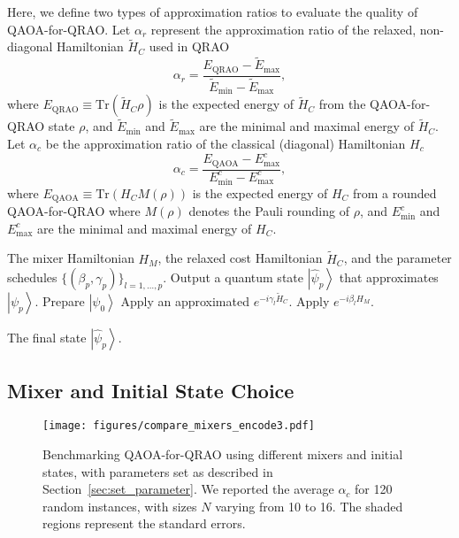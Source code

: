 \documentclass[conference,10pt]{IEEEtran}
\newcommand{\QAOAQRAO}{QAOA-for-QRAO}
\begin{document}
Here, we define two types of approximation ratios to evaluate the quality of \QAOAQRAO{}.  
Let $\alpha_r$ represent the approximation ratio of the relaxed, non-diagonal Hamiltonian $\tilde{H}_C$ used in QRAO 
\begin{equation} 
\alpha_r = \frac{ E_{\text{QRAO}} - \tilde{E}_{\text{max}}}{\tilde{E}_{\text{min}} - \tilde{E}_{\text{max}}}, 
\end{equation}
where $E_{\text{QRAO}} \equiv \mbox{Tr}(\tilde{H}_C\rho)$ is the expected energy of $\tilde{H}_C$ from the \QAOAQRAO{} state $\rho$, and $\tilde{E}_{\text{min}}$ and $\tilde{E}_{\text{max}}$ are the minimal and maximal energy of $\tilde{H}_C$. 
Let $\alpha_c$ be the approximation ratio of the classical (diagonal) Hamiltonian $H_c$ 
\begin{equation}
\alpha_c = \frac{E_{\text{QAOA}} - E_{\text{max}}^c}{E_{\text{min}}^c - E_{\text{max}}^c},
\end{equation}
where $E_{\text{QAOA}} \equiv \mbox{Tr}({H}_C \mathit{M}(\rho))$ is the expected energy of ${H}_C$ from a rounded \QAOAQRAO{} where $\mathit{M}(\rho)$ denotes the Pauli rounding of $\rho$, and $E_{\text{min}}^c$ and $E_{\text{max}}^c$ are the minimal and maximal energy of $H_C$. 

\begin{algorithm}[t]
\caption{Implement \QAOAQRAO{}}\label{alg:driftqrao}
\begin{algorithmic}[1]
    \Require The mixer Hamiltonian $H_M$, the relaxed cost Hamiltonian $\tilde{H}_C$, and the parameter schedules $\{(\beta_p, \gamma_p)\}_{l=1,\ldots,p}$.
    \Ensure Output a quantum state $\left|\widehat{\psi}_p \right>$ that approximates $\left|\psi_p\right>$.
    \State Prepare $\left|\psi_0\right>$
        \State Apply an approximated $e^{-i\gamma_l \tilde{H}_C}$.
        \State Apply $e^{-i\beta_l H_M}$.
    \EndFor
    
    \State \Return The final state $\left|\widehat{\psi}_p\right>$. 
\end{algorithmic}
\end{algorithm}









\subsection{Mixer and Initial State Choice}
\begin{figure}[t]
    \centering
    \texttt{[image: figures/compare\_mixers\_encode3.pdf]}
    \caption{Benchmarking \QAOAQRAO{} using different mixers and initial states, with parameters set as described in Section~\ref{sec:set_parameter}. We reported the average $\alpha_c$ for 120 random instances, with sizes $N$ varying from 10 to 16. The shaded regions represent the standard errors.} 
    \label{fig:compare_mixer}
\end{figure}
\end{document}
